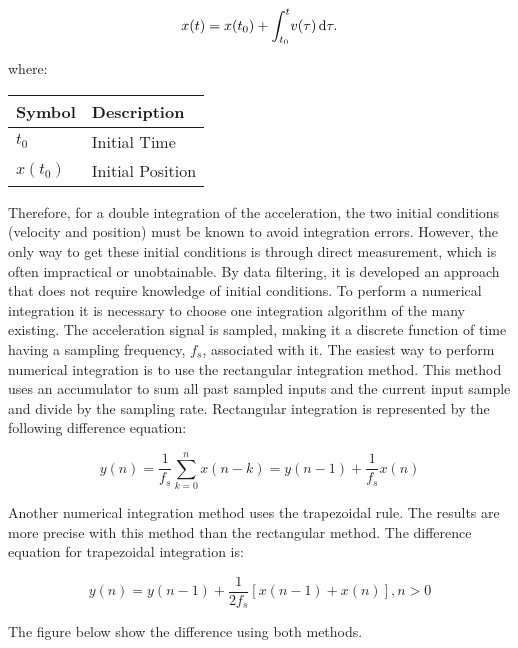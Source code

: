 \documentclass[tesi]{subfiles}
\begin{document}
\begin{center}
\begin{equation}
 {\large x(t) = x(t_{0}) + \int_{t_{0}}^{t} \! v(\tau) \, \mathrm{d}\tau.}
\end{equation}

where: 
\begin{table}[ht]
\centering
    \begin{tabular}{ | l | l |}
    
    \hline
    Symbol & Description \\ \hline
   \quad  $t_{0}$ & Initial Time \\ \hline
	   \quad  $x(t_{0})$ & Initial Position \\  
\hline 
    \end{tabular}
\end{table}
\end{center}
Therefore, for a double integration of the acceleration, the two initial
conditions (velocity and position) must be known to avoid integration errors. However,
the only way to get these initial conditions is through direct measurement, which is often
impractical or unobtainable. By  data filtering, it is developed an approach that does not require knowledge of initial conditions.
To perform a numerical integration it is necessary to choose one integration algorithm of the many existing. 
The acceleration signal is sampled, making it a discrete function of time having a sampling frequency, $f_{s}$, associated with it. The easiest way to perform numerical integration is to use the rectangular integration method. This method uses an accumulator to sum all past sampled inputs and the current input sample and divide by the sampling rate. Rectangular integration is represented by the following difference equation:

\begin{equation} 
y(n) = \dfrac{1}{f_{s}} \sum_{k=0}^{n} x(n-k) = y(n-1) + \dfrac{1}{f_{s}} x(n)
\end{equation}\label{eq:rectangular}


Another numerical integration method uses the trapezoidal rule. 
The results are more precise with this method than the rectangular method. The difference equation for trapezoidal integration is:

\begin{equation}
y(n) = y(n-1) + \dfrac{1}{2 f_{s}}[x(n-1) + x(n)], n > 0
\end{equation}\label{eq:trapezoidal}

\clearpage The figure below show the difference using both methods.
\end{document}
